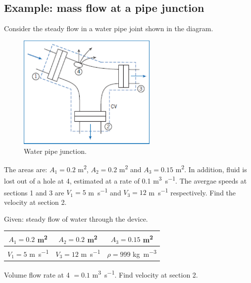 \documentclass[class=report, crop=false, 12pt,a4paper]{standalone}
\begin{document}
\subsection{Example: mass flow at a pipe junction}
Consider the steady flow in a water pipe joint shown in the diagram.
\begin{figure}[h]
  \centering
  \includegraphics[width = 0.6\textwidth]{../img/waterpipejunction}
  \caption{Water pipe junction.}
\end{figure}
The areas are: $A_1 = 0.2$ \si{\meter\squared}, $A_2 = 0.2$ \si{\meter\squared} and $A_3 = 0.15$ \si{\meter\squared}. In addition, fluid is lost out of a hole at 4, estimated at a rate of 0.1 \si{\meter\cubed\per\second}. The avergae speeds at sections 1 and 3 are $V_1 = 5$ \si{\meter\per\second} and $V_3 = 12$ \si{\meter\per\second} respectively. Find the velocity at section 2.

Given: steady flow of water through the device.
\begin{center}
  \begin{tabular}{|c|c|c|}
    \hline
    $A_1 = 0.2$ \si{\meter\squared} & $A_2 = 0.2$ \si{\meter\squared} &$A_3 = 0.15$ \si{\meter\squared}\\
    \hline
    $V_1 = 5$ \si{\meter\per\second} & $V_3 = 12$ \si{\meter\per\second} & $\rho = 999$ \si{\kg\per\meter\cubed}\\
    \hline
  \end{tabular}
\end{center}
Volume flow rate at 4 $=0.1$ \si{\meter\cubed\per\second}. Find velocity at section 2.
\end{document}
